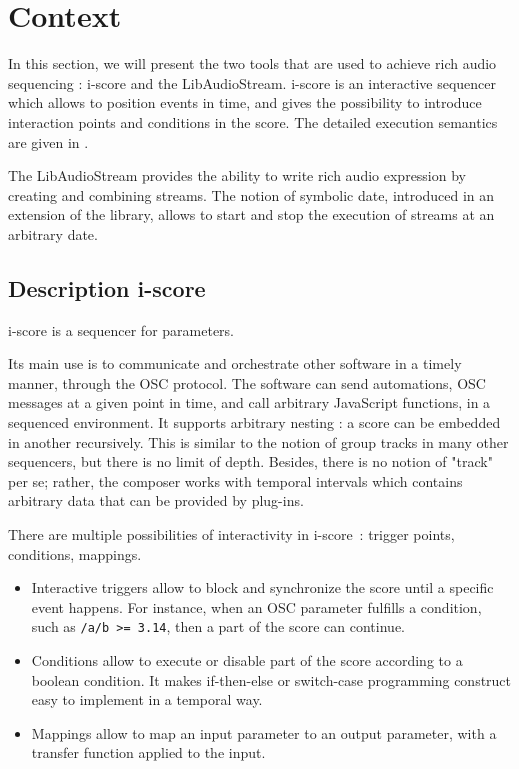\documentclass{article}
\begin{document}
\section{Context}
In this section, we will present the two tools that are used to achieve 
rich audio sequencing : i-score and the LibAudioStream.
i-score is an interactive sequencer which allows to position events 
in time, and gives the possibility to introduce interaction points and 
conditions in the score.
The detailed execution semantics are given in \cite{celerier2015ossia}.

The LibAudioStream\cite{letzlibaudiostream} provides the ability to write rich audio expression
by creating and combining streams. The notion of symbolic date, introduced in an extension of the library,
allows to start and stop the execution of streams at an arbitrary date.

\subsection{Description i-score}
i-score is a sequencer for parameters. 

Its main use is to communicate and orchestrate other software in a timely manner, 
through the OSC protocol.
The software can send automations, OSC messages at a given point in time, and call arbitrary JavaScript functions, in a sequenced environment.
It supports arbitrary nesting : a score can be embedded in another recursively.
This is similar to the notion of group tracks in many other sequencers, but 
there is no limit of depth. 
Besides, there is no notion of "track" per se; rather, the composer works with 
temporal intervals which contains arbitrary data that can be provided by plug-ins.

There are multiple possibilities of interactivity in i-score~: trigger points, conditions, 
mappings.
\begin{itemize}
    \item Interactive triggers allow to block and synchronize the score until a specific event happens.
    For instance, when an OSC parameter fulfills a condition, such as \lstinline|/a/b >= 3.14|, then 
    a part of the score can continue.
    \item Conditions allow to execute or disable part of the score according to a boolean condition.
    It makes if-then-else or switch-case programming construct easy to implement in a temporal way.
    \item Mappings allow to map an input parameter to an output parameter, with a transfer function applied to the input.
\end{itemize}
\end{document}
